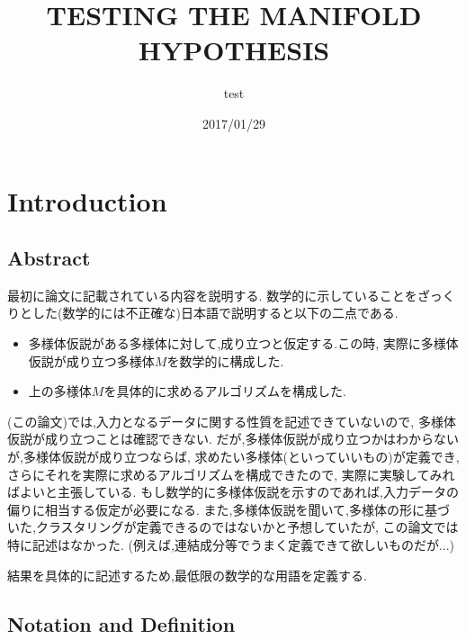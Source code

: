 \documentclass{ujarticle}
\title{TESTING THE MANIFOLD HYPOTHESIS}
\author{test}
\date{2017/01/29}
\begin{document}
\section{Introduction}
\label{introduction}


\subsection{Abstract}
\label{sub:Abstract}

最初に論文に記載されている内容を説明する.
数学的に示していることをざっくりとした(数学的には不正確な)日本語で説明すると以下の二点である.
\begin{itemize}
  \item 多様体仮説がある多様体に対して,成り立つと仮定する.この時,
  実際に多様体仮説が成り立つ多様体$M$を数学的に構成した.
  \item 上の多様体$M$を具体的に求めるアルゴリズムを構成した.
\end{itemize}

(この論文)では,入力となるデータに関する性質を記述できていないので,
多様体仮説が成り立つことは確認できない.
だが,多様体仮説が成り立つかはわからないが,多様体仮説が成り立つならば,
求めたい多様体(といっていいもの)が定義でき,さらにそれを実際に求めるアルゴリズムを構成できたので,
実際に実験してみればよいと主張している.
もし数学的に多様体仮説を示すのであれば,入力データの偏りに相当する仮定が必要になる.
また,多様体仮説を聞いて,多様体の形に基づいた,クラスタリングが定義できるのではないかと予想していたが,
この論文では特に記述はなかった.
(例えば,連結成分等でうまく定義できて欲しいものだが...)

結果を具体的に記述するため,最低限の数学的な用語を定義する.
\subsection{Notation and Definition}
\label{sub:Notation and Definition}
\end{document}
